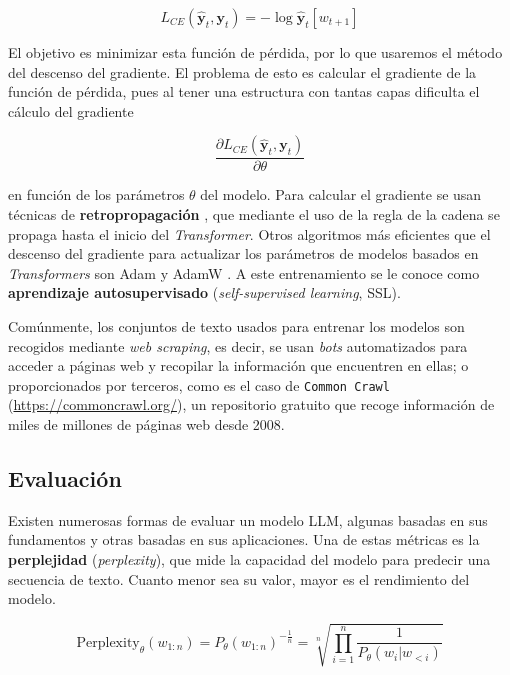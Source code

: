 \documentclass[12pt,twoside]{article}
\begin{document}
\begin{equation}
    L_{CE}(\hat{\mathbf{y}}_t,\mathbf{y}_t)=-\log\hat{\mathbf{y}}_t[w_{t+1}]
\end{equation}

El objetivo es minimizar esta función de pérdida, por lo que usaremos el método del descenso del gradiente. El problema de esto es calcular el gradiente de la función de pérdida, pues al tener una estructura con tantas capas dificulta el cálculo del gradiente

\begin{equation}
    \frac{\partial L_{CE}(\hat{\mathbf{y}}_t,\mathbf{y}_t)}{\partial \theta}
\end{equation}

en función de los parámetros $\theta$ del modelo. Para calcular el gradiente se usan técnicas de \textbf{retropropagación} \cite{retropropagación}, que mediante el uso de la regla de la cadena se propaga hasta el inicio del \textit{Transformer}. Otros algoritmos más eficientes que el descenso del gradiente para actualizar los parámetros de modelos basados en \textit{Transformers} son Adam \cite{Adam} y AdamW \cite{AdamW}. A este entrenamiento se le conoce como \textbf{aprendizaje autosupervisado} (\textit{self-supervised learning}, SSL).

Comúnmente, los conjuntos de texto usados para entrenar los modelos son recogidos mediante \textit{web scraping}, es decir, se usan \textit{bots} automatizados para acceder a páginas web y recopilar la información que encuentren en ellas; o proporcionados por terceros, como es el caso de \texttt{Common Crawl} (\url{https://commoncrawl.org/}), un repositorio gratuito que recoge información de miles de millones de páginas web desde 2008.

\subsection{Evaluación}
Existen numerosas formas de evaluar un modelo LLM, algunas basadas en sus fundamentos y otras basadas en sus aplicaciones. Una de estas métricas es la \textbf{perplejidad} (\textit{perplexity}), que mide la capacidad del modelo para predecir una secuencia de texto. Cuanto menor sea su valor, mayor es el rendimiento del modelo.

\begin{equation}
    \text{Perplexity}_\theta(w_{1:n})=P_\theta(w_{1:n})^{-\frac{1}{n}}=\sqrt[n]{\prod_{i=1}^n\frac{1}{P_\theta(w_{i}|w_{<i})}}
\end{equation}
\end{document}
